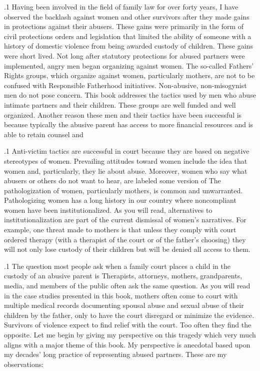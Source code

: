 \documentclass[11pt, twoside]{article}
\begin{document}
{\p.1{%
Having been involved in the field of family law for over forty years,
I have observed the backlash against women and other survivors after they made gains in protections against their abusers. These gains
were primarily in the form of civil protections orders and legislation that limited the ability of someone with a history of domestic
violence from being awarded custody of children. These gains were
short lived. Not long after statutory protections for abused partners
were implemented, angry men began organizing against women. The
so-called Fathers' Rights groups, which organize against women, particularly mothers, are not to be confused with Responsible Fatherhood
initiatives. Non-abusive, non-misogynist men do not pose concern.
This book addresses the tactics used by men who abuse intimate
partners and their children. These  groups are well
funded and well organized. Another reason these men and their tactics have been successful is because typically the abusive parent has
access to more financial resources and is able to retain counsel and
}%

\p.1{%
\enlargethispage{2em}
Anti-victim tactics are successful in court because they are based on
negative stereotypes of women. Prevailing attitudes toward women include the idea that women  and, particularly, they lie about abuse.
Moreover, women who say what abusers or others do not want to hear,
are labeled some version of  The pathologization of women, particularly mothers, is common and unwarranted. Pathologizing women
has a long history in our country where noncompliant women have been
institutionalized. As you will read, alternatives to institutionalization are
part of the current dismissal of women's narratives. For example, one
threat made to mothers is that unless they comply with court ordered
therapy (with a therapist of the court or of the father's choosing) they will
not only lose custody of their children but will be denied all access to
them.\newpage{}
}%

\p.1{%
The question most people ask when a family court places a child in the
custody of an abusive parent is  Therapists, attorneys, mothers, grandparents, media, and members of the public often
ask the same question. As you will read in the case studies presented in
this book, mothers often come to court with multiple medical records
documenting spousal abuse and sexual abuse of their children by the
father, only to have the court disregard or minimize the evidence. Survivors of violence expect to find relief with the court. Too often they
find the opposite. Let me begin by giving my perspective on this tragedy
which very much aligns with a major theme of this book.
My perspective is anecdotal based upon my decades' long practice of representing
abused partners. These are my observations:
}%

}
\end{document}
